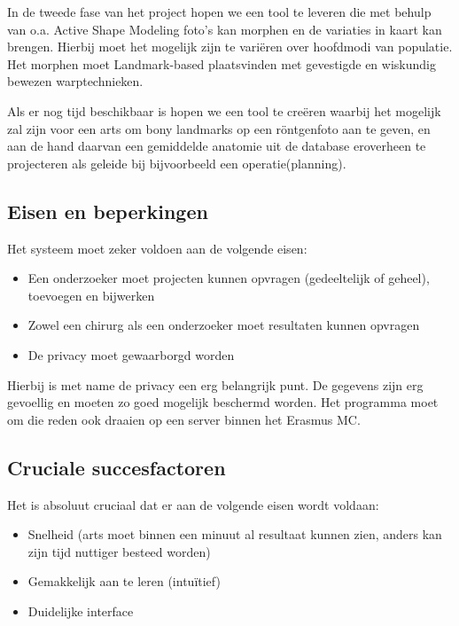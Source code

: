In de tweede fase van het project hopen we een tool te leveren die met behulp van o.a. Active Shape Modeling foto's kan morphen en de variaties in kaart kan brengen.
Hierbij moet het mogelijk zijn te vari\"eren over hoofdmodi van populatie.
Het morphen moet Landmark-based plaatsvinden met gevestigde en wiskundig bewezen warptechnieken.

Als er nog tijd beschikbaar is hopen we een tool te cre\"eren waarbij het mogelijk zal zijn voor een arts om bony landmarks op een r\"ontgenfoto aan te geven, en aan de hand daarvan een gemiddelde anatomie uit de database eroverheen te projecteren als geleide bij bijvoorbeeld een operatie(planning).

\subsection{Eisen en beperkingen}


Het systeem moet zeker voldoen aan de volgende eisen:
\begin{itemize}
  \item Een onderzoeker moet projecten kunnen opvragen (gedeeltelijk of geheel), toevoegen en bijwerken
  \item Zowel een chirurg als een onderzoeker moet resultaten kunnen opvragen
  \item De privacy moet gewaarborgd worden
\end{itemize}
Hierbij is met name de privacy een erg belangrijk punt.
De gegevens zijn erg gevoellig en moeten zo goed mogelijk beschermd worden.
Het programma moet om die reden ook draaien op een server binnen het Erasmus MC.

\subsection{Cruciale succesfactoren}

Het is absoluut cruciaal dat er aan de volgende eisen wordt voldaan:
\begin{itemize}
    \item Snelheid (arts moet binnen een minuut al resultaat kunnen zien, anders kan zijn tijd nuttiger besteed worden)
    \item Gemakkelijk aan te leren (intu\"itief)
    \item Duidelijke interface
\end{itemize}
